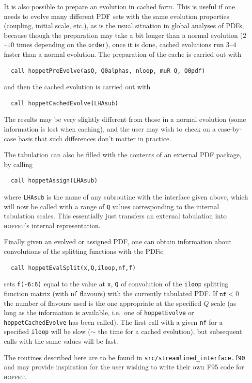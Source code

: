 \documentclass[12pt]{article}
\newcommand{\ie}{i.e.\ }
\newcommand{\hoppet}{\textsc{hoppet}\xspace}
\newcommand{\ttt}[1]{\texttt{#1}}
\begin{document}
It is also possible to prepare an evolution in cached form. This is
useful if one needs to evolve many different PDF sets with the same
evolution properties (coupling, initial scale, etc.), as is the
usual situation in global analyses of PDFs, because though
the preparation may take a bit longer than a normal evolution
($2$--$10$ times depending on the \ttt{order}), once it is done,
cached evolutions run $3$--$4$ faster than a normal evolution. The
preparation of the cache is carried out with
\begin{lstlisting}
  call hoppetPreEvolve(asQ, Q0alphas, nloop, muR_Q, Q0pdf)
\end{lstlisting}
and then the cached evolution is carried out with 
\begin{lstlisting}
  call hoppetCachedEvolve(LHAsub)
\end{lstlisting}
The results may be very slightly different from those in a normal
evolution (some information is lost when caching), and the user 
may wish to check on a case-by-case basis that such differences
don't matter in practice.

The tabulation can also be filled with the contents of an external PDF
package, by calling
\begin{lstlisting}
  call hoppetAssign(LHAsub)
\end{lstlisting}
where \ttt{LHAsub} is the name of any subroutine with the interface
given above, which will now be called with a range of \ttt{Q} values
corresponding to the internal tabulation scales. This essentially just
transfers an external tabulation into \hoppet's internal
representation. 

Finally given an evolved or assigned PDF, one can obtain information
about convolutions of the splitting functions with the PDFs:
\begin{lstlisting}
  call hoppetEvalSplit(x,Q,iloop,nf,f)
\end{lstlisting}
sets \ttt{f(-6:6)} equal to the value at \ttt{x}, \ttt{Q} of
convolution of the \ttt{iloop} splitting function matrix (with
\ttt{nf} flavours) with the currently tabulated PDF. If $\ttt{nf}<0$
the number of flavours used is the one appropriate at the specified
$Q$ scale (as long as the information is available, \ie one of
\ttt{hoppetEvolve} or \ttt{hoppetCachedEvolve} has been called). The
first call with a given \ttt{nf} for a specified \ttt{iloop} will be
slow ($\sim$ the time for a cached evolution), but subsequent calls
with the same values will be fast.

The routines described here 
are to be 
found in \ttt{src/streamlined\_interface.f90} and may provide inspiration
for the user wishing to write their own F95 code for \hoppet.
\end{document}
